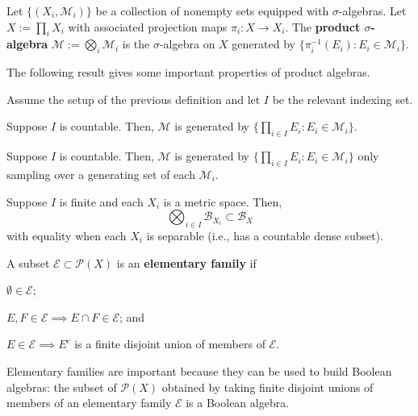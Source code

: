 \documentclass[11pt]{article}
\newcommand{\B}{\mathcal{B}}
\newcommand{\E}{\mathcal{E}}
\newcommand{\M}{\mathcal{M}}
\renewcommand{\P}{\mathcal{P}}
\begin{document}
\begin{definition}
Let $\{(X_i,\M_i)\}$ be a collection of nonempty sets equipped with $\sigma$-algebras. Let $X:=\prod_iX_i$ with associated projection maps $\pi_i: X\to X_i$. The \textbf{product $\sigma$-algebra} $\M:=\bigotimes_i\M_i$ is the $\sigma$-algebra on $X$ generated by $\{\pi_i^{-1}(E_i) : E_i\in\M_i\}$.
\end{definition}

The following result gives some important properties of product algebras.

\begin{proposition}
Assume the setup of the previous definition and let $I$ be the relevant indexing set. 
\begin{enum}{\alph}
\item Suppose $I$ is countable. Then, $\M$ is generated by $\{\prod_{i\in I}E_i : E_i\in\M_i\}$.

\item Suppose $I$ is countable. Then, $\M$ is generated by $\{\prod_{i\in I}E_i : E_i\in\M_i\}$ only sampling over a generating set of each $\M_i$.

\item Suppose $I$ is finite and each $X_i$ is a metric space. Then,
$$\bigotimes_{i\in I}\B_{X_i}\subset\B_X$$
with equality when each $X_i$ is separable (i.e., has a countable dense subset).
\end{enum}
\end{proposition}

\begin{definition}
A subset $\E\subset\P(X)$ is an \textbf{elementary family} if
\begin{enum}{\arabic}
\item $\emptyset\in\E$;
\item $E,F\in\E\implies E\cap F\in\E$; and
\item $E\in\E\implies E^c$ is a finite disjoint union of members of $\E$.
\end{enum}
\end{definition}

Elementary families are important because they can be used to build Boolean algebras: the subset of $\P(X)$ obtained by taking finite disjoint unions of members of an elementary family $\E$ is a Boolean algebra.
\end{document}
